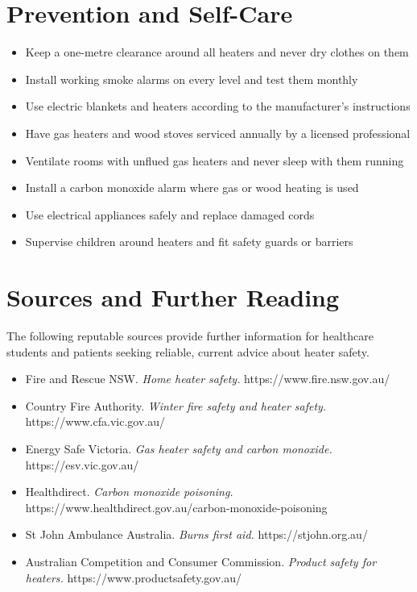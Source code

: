 \section*{Prevention and Self-Care}
\begin{itemize}
    \item Keep a one-metre clearance around all heaters and never dry clothes on them
    \item Install working smoke alarms on every level and test them monthly
    \item Use electric blankets and heaters according to the manufacturer's instructions
    \item Have gas heaters and wood stoves serviced annually by a licensed professional
    \item Ventilate rooms with unflued gas heaters and never sleep with them running
    \item Install a carbon monoxide alarm where gas or wood heating is used
    \item Use electrical appliances safely and replace damaged cords
    \item Supervise children around heaters and fit safety guards or barriers
\end{itemize}

\section*{Sources and Further Reading}
The following reputable sources provide further information for healthcare students and patients seeking reliable, current advice about heater safety.

\begin{itemize}
    \item Fire and Rescue NSW. \textit{Home heater safety.} https://www.fire.nsw.gov.au/
    \item Country Fire Authority. \textit{Winter fire safety and heater safety.} https://www.cfa.vic.gov.au/
    \item Energy Safe Victoria. \textit{Gas heater safety and carbon monoxide.} https://esv.vic.gov.au/
    \item Healthdirect. \textit{Carbon monoxide poisoning.} https://www.healthdirect.gov.au/carbon-monoxide-poisoning
    \item St John Ambulance Australia. \textit{Burns first aid.} https://stjohn.org.au/
    \item Australian Competition and Consumer Commission. \textit{Product safety for heaters.} https://www.productsafety.gov.au/
\end{itemize}
